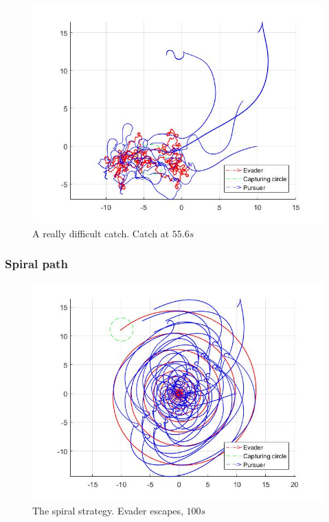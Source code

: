 \documentclass[ebook,11pt] {kth-mag}
\begin{document}
\begin{figure}[H]
\centering
\includegraphics[scale=0.35]{open_random_complex}
\caption{A really difficult catch. Catch at $55.6 s$}
\end{figure}

\subsubsection{Spiral path}
\begin{figure}[H]
\centering
\includegraphics[scale=0.35]{open_spiral_path}
\caption{The spiral strategy. Evader escapes, $100 s$}
\end{figure}
\end{document}
